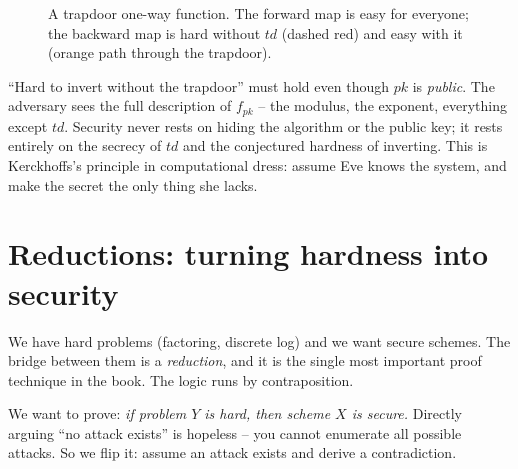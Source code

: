 \begin{figure}[H]
\centering
{}
\caption{A trapdoor one-way function. The forward map is easy for everyone; the backward map is hard without $td$ (dashed red) and easy with it (orange path through the trapdoor).}
\label{ch08:fig-trapdoor}
\end{figure}

\begin{trapbox}
``Hard to invert without the trapdoor'' must hold even though $pk$ is \emph{public}. The adversary sees the full description of $f_{pk}$ -- the modulus, the exponent, everything except $td$. Security never rests on hiding the algorithm or the public key; it rests entirely on the secrecy of $td$ and the conjectured hardness of inverting. This is Kerckhoffs's principle in computational dress: assume Eve knows the system, and make the secret the only thing she lacks.
\end{trapbox}

\section{Reductions: turning hardness into security}
\label{ch08:reductions}

We have hard problems (factoring, discrete log) and we want secure schemes. The bridge between them is a \emph{reduction}, and it is the single most important proof technique in the book. The logic runs by contraposition.

We want to prove: \emph{if problem $Y$ is hard, then scheme $X$ is secure.} Directly arguing ``no attack exists'' is hopeless -- you cannot enumerate all possible attacks. So we flip it: assume an attack exists and derive a contradiction.

